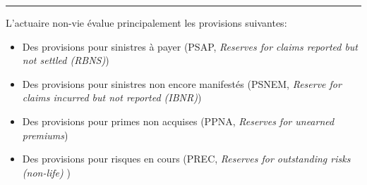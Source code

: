 \hrule

\begin{f}[Provision]
	
L'actuaire non-vie évalue principalement les 
provisions suivantes:
\begin{itemize}
	\item Des provisions pour sinistres à payer (PSAP, \emph{Reserves for claims reported but not settled (RBNS)}) 
	\item Des provisions pour sinistres non encore manifestés (PSNEM, \emph{Reserve for claims incurred but not reported (IBNR)})
	\item Des provisions pour primes non acquises (PPNA, \emph{Reserves for unearned premiums})
	\item Des provisions pour risques en cours (PREC,  \emph{Reserves for outstanding risks (non-life)}
	)
\end{itemize}

\end{f}




